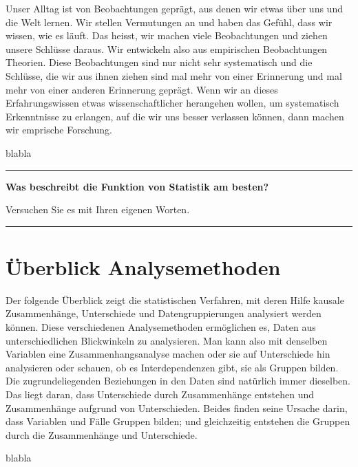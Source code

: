\documentclass[
  10pt,
  letterpaper,
  a4paper, twoside]{scrreprt}
\begin{document}
Unser Alltag ist von Beobachtungen geprägt, aus denen wir etwas über uns
und die Welt lernen. Wir stellen Vermutungen an und haben das Gefühl,
dass wir wissen, wie es läuft. Das heisst, wir machen viele
Beobachtungen und ziehen unsere Schlüsse daraus. Wir entwickeln also aus
empirischen Beobachtungen Theorien. Diese Beobachtungen sind nur nicht
sehr systematisch und die Schlüsse, die wir aus ihnen ziehen sind mal
mehr von einer Erinnerung und mal mehr von einer anderen Erinnerung
geprägt. Wenn wir an dieses Erfahrungswissen etwas wissenschaftlicher
herangehen wollen, um systematisch Erkenntnisse zu erlangen, auf die wir
uns besser verlassen können, dann machen wir emprische Forschung.

blabla

\begin{center}\rule{0.5\linewidth}{0.5pt}\end{center}

\textbf{Was beschreibt die Funktion von Statistik am besten?}

Versuchen Sie es mit Ihren eigenen Worten.

\begin{center}\rule{0.5\linewidth}{0.5pt}\end{center}

\section*{Überblick Analysemethoden}\label{uxfcberblick-analysemethoden}


Der folgende Überblick zeigt die statistischen Verfahren, mit deren
Hilfe kausale Zusammenhänge, Unterschiede und Datengruppierungen
analysiert werden können. Diese verschiedenen Analysemethoden
ermöglichen es, Daten aus unterschiedlichen Blickwinkeln zu analysieren.
Man kann also mit denselben Variablen eine Zusammenhangsanalyse machen
oder sie auf Unterschiede hin analysieren oder schauen, ob es
Interdependenzen gibt, sie als Gruppen bilden. Die zugrundeliegenden
Beziehungen in den Daten sind natürlich immer dieselben. Das liegt
daran, dass Unterschiede durch Zusammenhänge entstehen und Zusammenhänge
aufgrund von Unterschieden. Beides finden seine Ursache darin, dass
Variablen und Fälle Gruppen bilden; und gleichzeitig entstehen die
Gruppen durch die Zusammenhänge und Unterschiede.

blabla
\end{document}

